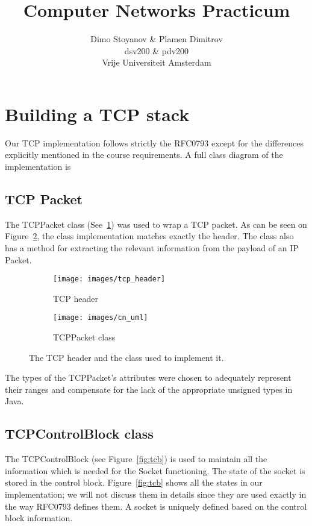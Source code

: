 \documentclass{article}
\title{	\textbf{Computer Networks Practicum}
		}
\author{
		Dimo Stoyanov \& Plamen Dimitrov\\
		dsv200 \& pdv200 \\
		Vrije Universiteit Amsterdam\\	
}
\begin{document}
\maketitle

\section{Building a TCP stack}
Our TCP implementation follows strictly the RFC0793 except for the differences explicitly
mentioned in the course requirements. A full class diagram of the implementation is 

\subsection{TCP Packet}
The TCPPacket class (See~\ref{fig:tcppacket}) was used to wrap a TCP packet. As can be seen
on Figure~\ref{fig:header}, the class implementation matches exactly the header. The class
also has a method for extracting the relevant information from the payload of an IP Packet.

\begin{figure}[h!]
\centering
\begin{subfigure}[b]{0.4\textwidth}
\texttt{[image: images/tcp\_header]}
\caption{TCP header}
\end{subfigure}
\qquad
\begin{subfigure}[b]{0.2\textwidth}
 \texttt{[image: images/cn\_uml]}
 \caption{TCPPacket class}
 \label{fig:tcppacket}
\end{subfigure}
\caption{The TCP header and the class used to implement it.}
\label{fig:header}
\end{figure}
\noindent
The types of the TCPPacket's attributes were chosen to adequately represent their ranges and compensate
for the lack of the appropriate unsigned types in Java.
  
\subsection{TCPControlBlock class}
The TCPControlBlock (see Figure~\ref{fig:tcb}) is used to maintain all the information which is needed
for the Socket functioning. The state of the socket is stored in the control block. Figure~\ref{fig:tcb}
shows all the states in our implementation; we will not discuss them in details since they are used
exactly in the way RFC0793 defines them. A socket is uniquely defined based on the control block information.
\end{document}
